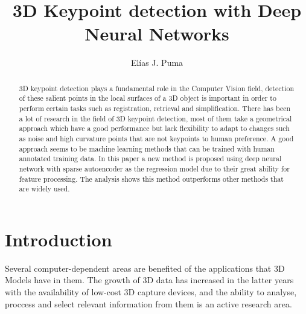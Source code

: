\documentclass{comjnl}
\begin{document}
\title[Modelling Bidders in Sequential Automated Auctions]{3D Keypoint detection with Deep Neural Networks}
\author{El\'{i}as J. Puma}






\begin{abstract}
3D keypoint detection plays a fundamental role in the Computer Vision field, detection of these salient points in the local surfaces of a 3D object is important in order to perform certain tasks such as registration, retrieval and simplification. There has been a lot of research in the field of 3D keypoint detection, most of them take a geometrical approach which have a good performance but lack flexibility to adapt to changes such as noise and high curvature points that are not keypoints to human preference. A good approach seems to be machine learning methods that can be trained with human annotated training data. In this paper a new method is proposed using deep neural network with sparse autoencoder as the regression model due to their great ability for feature processing. The analysis shows this method outperforms other methods that are widely used.  
\end{abstract}

\maketitle


\section{Introduction}
Several computer-dependent areas are benefited of the applications
that 3D Models have in them. The growth of 3D data has increased in
the latter years with the availability of low-cost 3D capture devices,
and the ability to analyse, proccess and select relevant information
from them is an active research area. 
\end{document}
